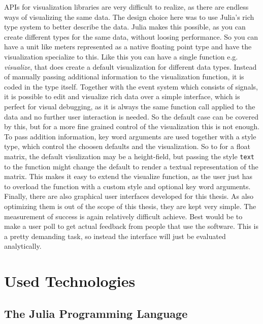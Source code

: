 \ac{API}s for visualization libraries are very difficult to realize, as there are endless ways of visualizing the same data.
The design choice here was to use Julia's rich type system to better describe the data. 
Julia makes this possible, as you can create different types for the same data, without loosing performance.
So you can have a unit like meters represented as a native floating point type and have the visualization specialize to this.
Like this you can have a single function e.g. \textit{visualize}, that does create a default visualization for different data types. Instead of manually passing additional information to the visualization function, it is coded in the type itself.
Together with the event system which consists of signals, it is possible to edit and visualize rich data over a simple interface, which is perfect for visual debugging, as it is always the same function call applied to the data and no further user interaction is needed.
So the default case can be covered by this, but for a more fine grained control of the visualization this is not enough.
To pass addition information, key word arguments are used together with a style type, which control the choosen defaults and the visualization.
So to for a float matrix, the default visulization may be a height-field, but passing the style \texttt{text} to the function might change the default to render a textual representation of the matrix.
This makes it easy to extend the visualize function, as the user just has to overload the function with a custom style and optional key word arguments.
Finally, there are also graphical user interfaces developed for this thesis. As also optimizing them is out of the scope of this thesis, they are kept very simple.
The measurement of success is again relatively difficult achieve.
Best would be to make a user poll to get actual feedback from people that use the software. This is a pretty demanding task, so instead the interface will just be evaluated analytically.


\section{Used Technologies}

\subsection{The Julia Programming Language}

